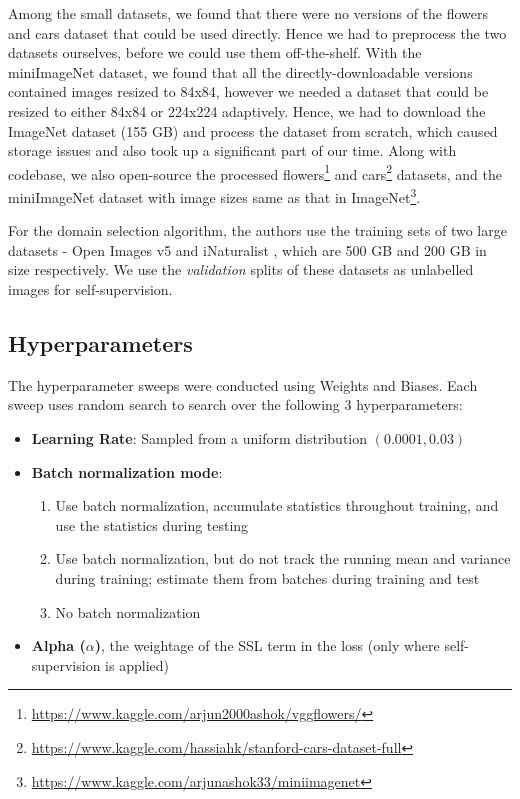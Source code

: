 Among the small datasets, we found that there were no versions of the flowers and cars dataset that could be used directly. Hence we had to preprocess the two datasets ourselves, before we could use them off-the-shelf. With the miniImageNet dataset, we found that all the directly-downloadable versions \cite{rengithub} \cite{yao2github} contained images resized to 84x84, however we needed a dataset that could be resized to either 84x84 or 224x224 adaptively. Hence, we had to download the ImageNet dataset (155 GB) and process the dataset from scratch, which caused storage issues and also took up a significant part of our time. Along with codebase, we also open-source the processed flowers\footnote[4]{\url{https://www.kaggle.com/arjun2000ashok/vggflowers/}} and cars\footnote[5]{\url{https://www.kaggle.com/hassiahk/stanford-cars-dataset-full}} datasets, and the miniImageNet dataset with image sizes same as that in ImageNet\footnote[6]{\url{https://www.kaggle.com/arjunashok33/miniimagenet}}. 

For the domain selection algorithm, the authors use the training sets of two large datasets - Open Images v5 \cite{openimages} and iNaturalist \cite{inat}, which are 500 GB and 200 GB in size respectively. We use the \textit{validation} splits of these datasets as unlabelled images for self-supervision.

\subsection{Hyperparameters}

The hyperparameter sweeps were conducted using Weights and Biases.  Each sweep uses {random search} to search over the following $3$ hyperparameters:

\begin{itemize}
    \item \textbf{Learning Rate}: Sampled from a uniform distribution $(0.0001, 0.03)$
    \item \textbf{Batch normalization mode}: 
    \begin{enumerate}
        \item Use batch normalization, accumulate statistics throughout training, and use the statistics during testing
        \item Use batch normalization, but do not track the running mean and variance during training; estimate them from batches during training and test
        \item No batch normalization
    \end{enumerate}
    \item \textbf{Alpha ($\alpha$)}, the weightage of the SSL term in the loss (only where self-supervision is applied)
\end{itemize}

